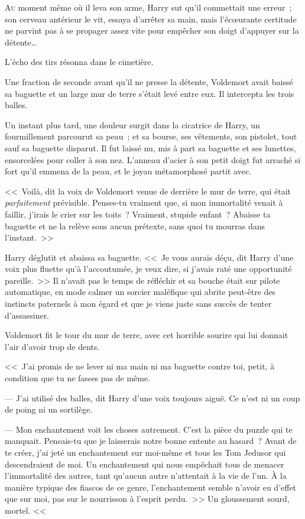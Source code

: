 
\lettrine{A}{u} moment même où il leva son arme, Harry sut qu'il commettait une erreur~; son cerveau antérieur le vit, essaya d'arrêter sa main, mais l'écœurante certitude ne parvint pas à se propager assez vite pour empêcher son doigt d'appuyer sur la détente…

L'écho des tirs résonna dans le cimetière.

Une fraction de seconde avant qu'il ne presse la détente, Voldemort avait baissé sa baguette et un large mur de terre s'était levé entre eux. Il intercepta les trois balles.

Un instant plus tard, une douleur surgit dans la cicatrice de Harry, un fourmillement parcourut sa peau~; et sa bourse, ses vêtements, son pistolet, tout sauf sa baguette disparut. Il fut laissé nu, mis à part sa baguette et ses lunettes, ensorcelées pour coller à son nez. L'anneau d'acier à son petit doigt fut arraché si fort qu'il emmena de la peau, et le joyau métamorphosé partit avec.

<<~Voilà, dit la voix de Voldemort venue de derrière le mur de terre, qui était \emph{parfaitement} prévisible. Penses-tu vraiment que, si mon immortalité venait à faillir, j'irais le crier sur les toits~? Vraiment, stupide enfant~? Abaisse ta baguette et ne la relève sous aucun prétexte, sans quoi tu mourras dans l'instant.~>>

Harry déglutit et abaissa sa baguette. <<~Je vous aurais déçu, dit Harry d'une voix plus fluette qu'à l'accoutumée, je veux dire, si j'avais raté une opportunité pareille.~>> Il n'avait pas le temps de réfléchir et sa bouche était sur pilote automatique, en mode calmer un sorcier maléfique qui abrite peut-être des instincts paternels à mon égard et que je viens juste sans succès de tenter d'assassiner.

Voldemort fit le tour du mur de terre, avec cet horrible sourire qui lui donnait l'air d'avoir trop de dents.

<<~J'ai promis de ne lever ni ma main ni ma baguette contre toi, petit, à condition que tu ne fasses pas de même.

--- J'ai utilisé des balles, dit Harry d'une voix toujours aiguë. Ce n'est ni un coup de poing ni un sortilège.

--- Mon enchantement voit les choses autrement. C'est la pièce du puzzle qui te manquait. Pensais-tu que je laisserais notre bonne entente au hasard~? Avant de te créer, j'ai jeté un enchantement sur moi-même et tous les Tom Jedusor qui descendraient de moi. Un enchantement qui nous empêchait tous de menacer l'immortalité des autres, tant qu'aucun autre n'attentait à la vie de l'un. À la manière typique des fiascos de ce genre, l'enchantement semble n'avoir eu d'effet que sur moi, pas sur le nourrisson à l'esprit perdu.~>> Un gloussement sourd, mortel. <<~

